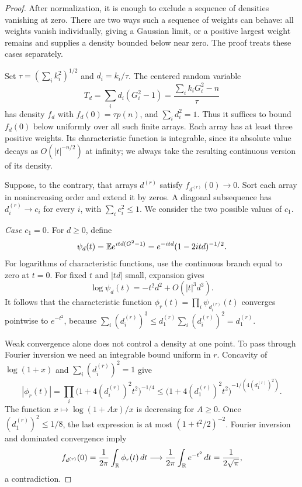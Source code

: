 \begin{proof}
After normalization, it is enough to exclude a sequence of densities
vanishing at zero. There are two ways such a sequence of weights can
behave: all weights vanish individually, giving a Gaussian limit, or a
positive largest weight remains and supplies a density bounded below
near zero. The proof treats these cases separately.

Set $\tau=(\sum_i k_i^2)^{1/2}$ and $d_i=k_i/\tau$. The centered
random variable
\[
 T_d=\sum_i d_i(G_i^2-1)
     =\frac{\sum_i k_iG_i^2-n}{\tau}
\]
has density $f_d$ with $f_d(0)=\tau p(n)$, and
$\sum_i d_i^2=1$.  Thus it suffices to bound $f_d(0)$ below uniformly
over all such finite arrays.  Each array has at least three positive
weights.  Its characteristic function is integrable, since its
absolute value decays as $O(|t|^{-n/2})$ at infinity; we always take
the resulting continuous version of its density.

Suppose, to the contrary, that arrays $d^{(r)}$ satisfy
$f_{d^{(r)}}(0)\to0$.  Sort each array in nonincreasing order and
extend it by zeros.  A diagonal subsequence has
$d_i^{(r)}\to c_i$ for every $i$, with
$\sum_i c_i^2\le1$.  We consider the two possible values of $c_1$.

\smallskip
\noindent\emph{Case $c_1=0$.}
For $d\ge0$, define
\[
 \psi_d(t)=\mathbb E e^{itd(G^2-1)}
          =e^{-itd}(1-2itd)^{-1/2}.
\]
For logarithms of characteristic functions, use the continuous
branch equal to zero at $t=0$.
For fixed $t$ and $|td|$ small, expansion gives
\[
 \log\psi_d(t)=-t^2d^2+O(|t|^3d^3).
\]
It follows that the characteristic function
$\phi_r(t)=\prod_i\psi_{d_i^{(r)}}(t)$ converges pointwise to
$e^{-t^2}$, because
$\sum_i(d_i^{(r)})^3\le d_1^{(r)}\sum_i(d_i^{(r)})^2=d_1^{(r)}$.

Weak convergence alone does not control a density at one point.
To pass through Fourier inversion we need an integrable bound uniform
in $r$. Concavity of $\log(1+x)$ and
$\sum_i(d_i^{(r)})^2=1$ give
\[
 |\phi_r(t)|
 =\prod_i\bigl(1+4(d_i^{(r)})^2t^2\bigr)^{-1/4}
 \le
 \bigl(1+4(d_1^{(r)})^2t^2\bigr)^{-1/(4(d_1^{(r)})^2)}.
\]
The function $x\mapsto \log(1+Ax)/x$ is decreasing for $A\ge0$.
Once $(d_1^{(r)})^2\le1/8$, the last expression is at most
$(1+t^2/2)^{-2}$.  Fourier inversion and dominated convergence imply
\[
 f_{d^{(r)}}(0)
 =\frac1{2\pi}\int_{\mathbb R}\phi_r(t)\,dt
 \longrightarrow
 \frac1{2\pi}\int_{\mathbb R}e^{-t^2}\,dt
 =\frac1{2\sqrt\pi},
\]
a contradiction.


\end{proof}
